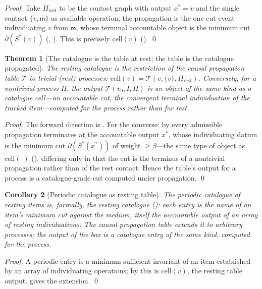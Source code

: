 \documentclass[11pt,a4paper]{article}
\theoremstyle{thmstyle}
\newtheorem{theorem}{Theorem}[section]
\newtheorem{corollary}[theorem]{Corollary}
\theoremstyle{definition}
\theoremstyle{remark}
\newcommand{\med}{\mathsf{m}}            %
\newcommand{\flo}{\beta}                 %
\newcommand{\cut}{\partial}              %
\newcommand{\Proc}{\Pi}                  %
\begin{document}
\begin{proof}
Take $\Proc_{\mathrm{rest}}$ to be the contact graph with output
$x^{\ast}=v$ and the single contact $\{v,\med\}$ as available operation;
the propagation is the one cut event individuating $v$ from $\med$, whose
terminal accountable object is the minimum cut $\cut(S^{\ast}(v))$
(, ). This is precisely
$\mathrm{cell}(v)$ (). \qed
\end{proof}

\begin{theorem}[The catalogue is the table at rest; the table is the
catalogue propagated]
\label{thm:catalogue-table}
The resting catalogue is the restriction of the causal propagation table
$\mathcal{T}$ to trivial (rest) processes:
$\mathrm{cell}(v)=\mathcal{T}(v,\{v\},\Proc_{\mathrm{rest}})$. Conversely,
for a nontrivial process $\Proc$, the output
$\mathcal{T}(v_0,I,\Proc)$ is an object of the same kind as a catalogue
cell---an accountable cut, the convergent terminal individuation of the
tracked item---computed for the process rather than for rest.
\end{theorem}

\begin{proof}
The forward direction is . For the converse: by
 every admissible propagation terminates at the
accountable output $x^{\ast}$, whose individuating datum is the minimum cut
$\cut(S^{\ast}(x^{\ast}))$ of weight $\ge\flo$---the same type of object as
$\mathrm{cell}(\cdot)$ (), differing only in that the
cut is the terminus of a nontrivial propagation rather than of the rest
contact. Hence the table's output for a process is a catalogue-grade cut
computed under propagation. \qed
\end{proof}

\begin{corollary}[Periodic catalogue as resting table]
\label{cor:periodic}
The periodic catalogue of resting items \citep{mendeleev1869,scerri2007}
is, formally, the resting catalogue (): each entry is
the name of an item's minimum cut against the medium, itself the
accountable output of an array of resting individuations. The causal
propagation table extends it to arbitrary processes; the output of the box
is a catalogue entry of the same kind, computed for the process.
\end{corollary}

\begin{proof}
A periodic entry is a minimum-sufficient invariant of an item established
by an array of individuating operations; by  this
is $\mathrm{cell}(v)$, the resting table output. 
gives the extension. \qed
\end{proof}
\end{document}
